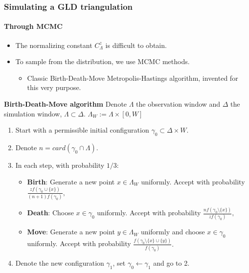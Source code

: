 \documentclass[c, 10pt]{beamer}
\begin{document}
\begin{frame}\frametitle{Simulating a GLD triangulation}\framesubtitle{Through MCMC}

\begin{small}
\begin{itemize}
    \item The normalizing constant $C^{z}_\Lambda$ is difficult to obtain.
    \item To sample from the distribution, we use MCMC methods.
    \begin{itemize}
        \item Classic Birth-Death-Move Metropolis-Hastings algorithm, invented for this very purpose.
    \end{itemize} 
\end{itemize}


\textbf{Birth-Death-Move algorithm}\newline
Denote $\Lambda$ the observation window and $\Delta$ the simulation window, $\Lambda \subset \Delta$. $\Lambda_W := \Lambda \times [0,W]$
\begin{enumerate}
    \item Start with a permissible initial configuration $\gamma_0 \subset \Delta \times W$. 
    \item Denote $n=card(\gamma_0\cap \Lambda)$.
    \item In each step, with probability $1/3$:
    \begin{itemize}
        \item \textbf{Birth}: Generate a new point $x \in \Lambda_W$ uniformly. Accept with probability  $ \frac{z f(\gamma_0 \cup \{x\})}{(n+1)f(\gamma_0)},$
        \item \textbf{Death}: Choose $x\in\gamma_0$ uniformly. Accept with probability $ \frac{n f(\gamma_0 \setminus \{x\})}{zf(\gamma_0)},$
        \item \textbf{Move}: Generate a new point $y \in \Lambda_W$ uniformly and choose $x\in\gamma_0$ uniformly. Accept with probability $ \frac{f(\gamma_0 \setminus \{x\} \cup \{y\})}{f(\gamma_0)}.$
    \end{itemize}
    \item Denote the new configuration $\gamma_1$, set $\gamma_0 \leftarrow \gamma_1$ and go to 2.

\end{enumerate}

\end{small}
\end{frame}
 
\end{document}
